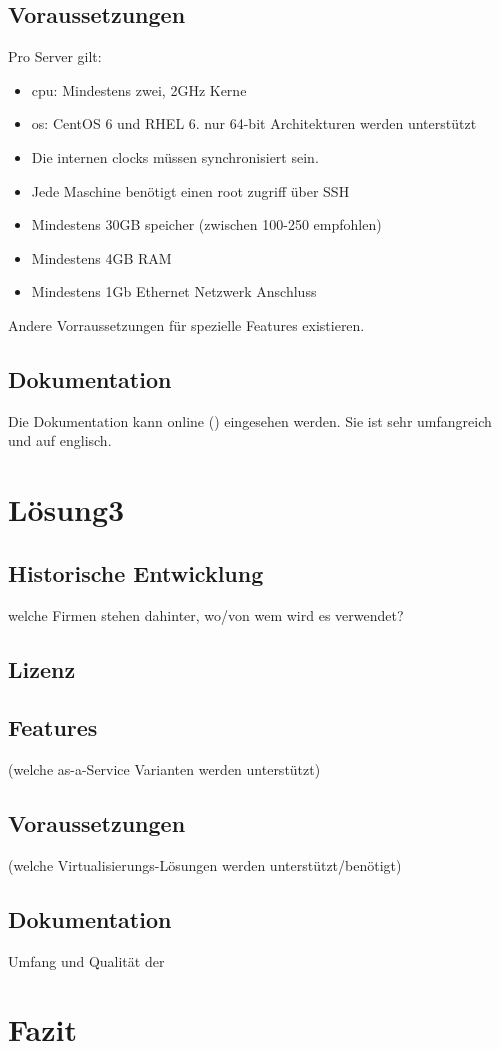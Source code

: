 \documentclass[a4paper,nochapterprefix,ngerman,12pt]{scrreprt}
\begin{document}
\section{Voraussetzungen}
Pro Server gilt:
\begin{itemize}
\item \gls{cpu}: Mindestens zwei, 2GHz Kerne
\item \gls{os}:  CentOS 6 und RHEL 6. nur 64-bit Architekturen werden unterstützt
\item Die internen clocks müssen synchronisiert sein.
\item Jede Maschine benötigt einen root zugriff über SSH
\item Mindestens 30GB speicher (zwischen 100-250 empfohlen)
\item Mindestens 4GB RAM
\item Mindestens 1Gb Ethernet Netzwerk Anschluss
\end{itemize}
Andere Vorraussetzungen für spezielle Features existieren. \cite{EucalyptusRequ}
\section{Dokumentation}
Die Dokumentation kann online (\cite{EucalyptusDoc}) eingesehen werden.
Sie ist sehr umfangreich und auf englisch.


\chapter{Lösung3} \thispagestyle{fancy}
\section{Historische Entwicklung}
welche Firmen stehen dahinter, wo/von wem wird es verwendet?
\section{Lizenz}
\section{Features}
(welche as-a-Service Varianten werden unterstützt)
\section{Voraussetzungen}
(welche Virtualisierungs-Lösungen werden unterstützt/benötigt)
\section{Dokumentation}
Umfang und Qualität der

\chapter{Fazit} \thispagestyle{fancy}

 \thispagestyle{fancy}
 \thispagestyle{fancy}

\listoffigures \thispagestyle{fancy}

\printglossary[style=tree,title={Glossar}]  \thispagestyle{fancy}

\label{lastpage}
\end{document}
